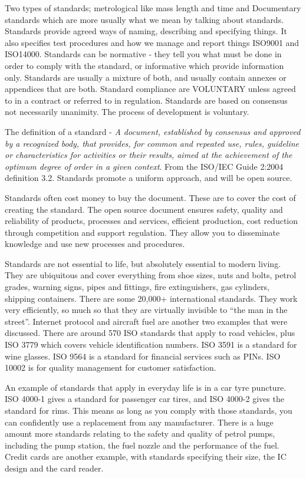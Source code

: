 Two types of standards; metrological like mass length and time and Documentary standards which are more usually what we mean by talking about standards. 
Standards provide agreed ways of naming, describing and specifying things. 
It also specifies test procedures and how we manage and report things ISO9001 and ISO14000. 
Standards can be normative - they tell you what must be done in order to comply with the standard, or informative which provide information only. 
Standards are usually a mixture of both, and usually contain annexes or appendices that are both. 
Standard compliance are VOLUNTARY unless agreed to in a contract or referred to in regulation. 
Standards are based on consensus not necessarily unanimity. 
The process of development is voluntary. 

The definition of a standard - \textit{A document, established by consensus and approved by a recognized body, that provides, for common and repeated use, rules, guideline or characteristics for activities or their results, aimed at the achievement of the optimum degree of order in a given context}.
 From the ISO/IEC Guide 2:2004 definition 3.2. 
Standards promote a uniform approach, and will be open source.

Standards often cost money to buy the document. 
These are to cover the cost of creating the standard. 
The open source document ensures safety, quality and reliability of products, processes and services, efficient production, cost reduction through competition and support regulation. 
They allow you to disseminate knowledge and use new processes and procedures. 

Standards are not essential to life, but absolutely essential to modern living. 
They are ubiquitous and cover everything from shoe sizes, nuts and bolts, petrol grades, warning signs, pipes and fittings, fire extinguishers, gas cylinders, shipping containers. 
There are some 20,000+ international standards. 
They work very efficiently, so much so that they are virtually invisible to ``the man in the street''. Internet protocol and aircraft fuel are another two examples that were discussed. 
There are around 570 ISO standards that apply to road vehicles, plus ISO 3779 which covers vehicle identification numbers. ISO 3591 is a standard for wine glasses. 
ISO 9564 is a standard for financial services such as PINs. ISO 10002 is for quality management for customer satisfaction.

An example of standards that apply in everyday life is in a car tyre puncture. 
ISO 4000-1 gives a standard for passenger car tires, and ISO 4000-2 gives the standard for rims. 
This means as long as you comply with those standards, you can confidently use a replacement from any manufacturer. 
There is a huge amount more standards relating to the safety and quality of petrol pumps, including the pump station, the fuel nozzle and the performance of the fuel. 
Credit cards are another example, with standards specifying their size, the IC design and the card reader.

